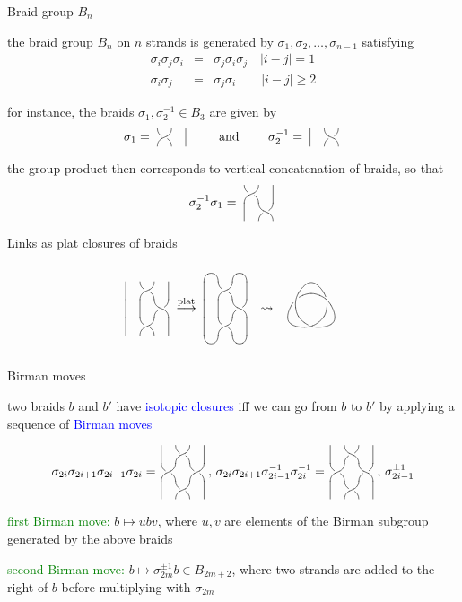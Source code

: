\documentclass{prosper}
\renewcommand{\>}{\rangle}
\newcommand{\<}{\langle}
\newcommand{\sig}{\sigma}
\def\r{\vtwist, c+(2,1)}
\def\l{\vtwistneg, c+(2,1)}
\def\s{\POS c+(0,0) *{};p-(0,1) *{} **\dir{-};c+(1,0)}
\def\N{\POS "A"-(0,1)="A";"A"}
\def\braid#1#2{\,\,\xy 0;<.4cm,0cm>:<0cm,.5cm>:: \POS (0,#1)="A";"A" #2 \endxy\,\,}
\def\caps#1#2{\POS c="B";"B"+(#1,0),\vcap[#2];"B";"B"}
\def\cups#1#2{\POS c="B";"B"+(#1,0),\vcap[-#2];"B";"B"}
\begin{document}



\begin{slide}{Braid group $B_n$} 

the braid group $B_n$ on $n$ strands is generated by
$\sig_1,\sig_2,\dotsc,\sig_{n-1}$ satisfying
\begin{eqnarray*}
\sig_i\sig_{j}\sig_i &=& \sig_{j}\sig_i\sig_{j} \quad |i-j| = 1 \\
\sig_i \sig_j &=& \sig_j\sig_i \quad\quad |i-j| \geq 2
\end{eqnarray*}

for instance, the braids
$\sig_1,\sig_2^{-1}\in B_3$ are given by
\[
\sig_1 = \braid{.5}{\r\s} \quad\quad\text{ and }\quad\quad
\sig_2^{-1} = \braid{.5}{\s\l}
\]

the group product then corresponds to vertical concatenation of
braids, so that
\[
\sig_2^{-1}\sig_1 = \braid{1}{\r\s\N\s\l}
\]

\end{slide}


\begin{slide}{Links as plat closures of braids}

\[
\braid{1.5}{
\s\r\s\N
\s\s\l\N
\s\r\s
} \stackrel{\text{plat}}{\longrightarrow}
\braid{1.5}{
\caps{0}{1}\caps{2}{1}\s\r\s\N
\s\s\l\N
\s\r\s\N
\cups{0}{1}\cups{2}{1}
} \,\,\,\rightsquigarrow\,
\xygraph{
!{0;/r1.0pc/:}
!P3"a"{~>{}}
!P9"b"{~:{(1.3288,0):}~>{}}
!P3"c":{~:{(2.5,0):}~>{}}
!{\vunder~{"b2"}{"b1"}{"a1"}{"a3"}}
!{\vcap~{"c1"}{"c1"}{"b4"}{"b2"}}
!{\vunder~{"b5"}{"b4"}{"a2"}{"a1"}}
!{\vcap~{"c2"}{"c2"}{"b7"}{"b5"}}
!{\vunder~{"b8"}{"b7"}{"a3"}{"a2"}}
!{\vcap~{"c3"}{"c3"}{"b1"}{"b8"}}
}
\]


\end{slide}

\begin{slide}{Birman moves}

two braids $b$ and $b'$ have \textcolor{blue}{isotopic closures} iff we
can go from $b$ to $b'$ by applying a sequence of
\textcolor{blue}{Birman moves}

\[
\sig_{2i}\sig_{2i+1}\sig_{2i-1}\sig_{2i} =\! 
\braid{1.5}{\s\r\s\N\r\r\N\s\r\s},\,
\sig_{2i}\sig_{2i+1}\sig_{2i-1}^{-1}\sig_{2i}^{-1} =\! 
\braid{1.5}{\s\l\s\N\r\l\N\s\r\s},\,
\sig_{2i-1}^{\pm 1}
\]

\bigskip
\textcolor{green}{first Birman move:} $b\mapsto u b v$, where
$u,v$ are elements of the Birman subgroup generated by the above braids

\bigskip
\textcolor{green}{second Birman move:} $b\mapsto \sig_{2m}^{\pm 1}b \in
B_{2m+2}$, where two strands are added to the right of $b$ before
multiplying with $\sig_{2m}$

\end{slide}
\end{document}
